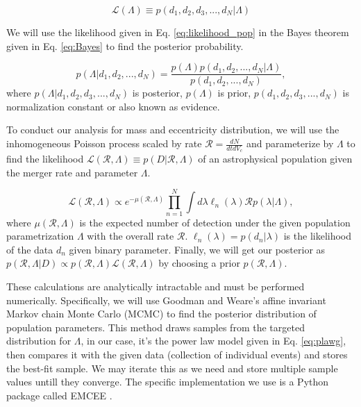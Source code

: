 \documentclass[twocolumn,prd,nofootinbib]{revtex4}
\begin{document}
\begin{equation}
\label{eq:likelihood_pop}    
\mathcal{L}(\Lambda)\equiv p(d_1,d_2,d_3,...,d_N|\Lambda)
\end{equation}

 

We will use the likelihood given in Eq. \ref{eq:likelihood_pop} in the Bayes theorem given in Eq. \ref{eq:Bayes} to find the posterior probability.

\begin{equation}
\label{eq:Bayes}    
p(\Lambda|d_1,d_2,...,d_N)= \frac{p(\Lambda)p(d_1,d_2,...,d_N|\Lambda)}{p(d_1,d_2,...,d_N)},
\end{equation}
%
where $p(\Lambda|d_1,d_2,d_3,...,d_N)$ is posterior, $p(\Lambda)$ is prior, $p(d_1,d_2,d_3,...,d_N)$ is normalization constant or also known as evidence.

To conduct our analysis for mass and eccentricity distribution, we will use the inhomogeneous Poisson process scaled by rate $\mathcal{R} = \frac{dN}{dtdV_c}$ and parameterize by $\Lambda$ to find the likelihood  $\mathcal{L}(\mathcal{R},\Lambda)\equiv p(D|\mathcal{R},\Lambda)$ of an astrophysical population given the merger rate and parameter $\Lambda$. 

\begin{equation}
\label{eq: likelihood}
\mathcal{L}(\mathcal{R},\Lambda) \propto e^{-\mu(\mathcal{R},\Lambda)}\prod_{n=1}^N\int d\lambda \ell_n(\lambda) \mathcal{R} p(\lambda|\Lambda),
\end{equation}
%
where $\mu(\mathcal{R},\Lambda)$ is the expected number of detection under the given population parametrization $\Lambda$ with the overall rate $\mathcal{R}$. $\ell_n(\lambda)=p(d_n|\lambda)$ is the likelihood of the data $d_n$ given binary parameter.
Finally, we will get our posterior as $p(\mathcal{R},\Lambda | D)\propto p(\mathcal{R},\Lambda)  \mathcal{L}(\mathcal{R},\Lambda)$ by choosing a prior $p(\mathcal{R},\Lambda)$.

These calculations are analytically intractable and must be performed numerically. Specifically, we will use Goodman and Weare's affine invariant Markov chain Monte Carlo (MCMC) \cite{mcmc_paper} to find the posterior distribution of population parameters. This method draws samples from the targeted distribution for $\Lambda$, in our case, it's the power law model given in Eq. \ref{eq:plawg}, then compares it with the given data (collection of individual events) and stores the best-fit sample. We may iterate this as we need and store multiple sample values untill they converge. 
The specific implementation we use is a Python package called EMCEE \cite{emcee_paper}.
\end{document}
